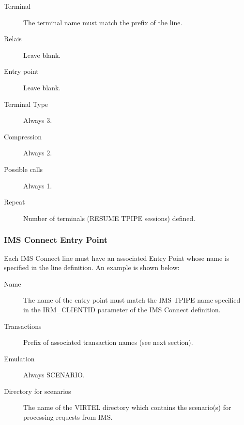\documentclass[letterpaper,10pt,english]{sphinxmanual}
\begin{document}

\begin{description}
\item[{Terminal}] \leavevmode
The terminal name must match the prefix of the line.

\item[{Relais}] \leavevmode
Leave blank.

\item[{Entry point}] \leavevmode
Leave blank.

\item[{Terminal Type}] \leavevmode
Always 3.

\item[{Compression}] \leavevmode
Always 2.

\item[{Possible calls}] \leavevmode
Always 1.

\item[{Repeat}] \leavevmode
Number of terminals (RESUME TPIPE sessions) defined.

\end{description}


\subsubsection{IMS Connect Entry Point}
\label{\detokenize{connectivity_guide:ims-connect-entry-point}}
Each IMS Connect line must have an associated Entry Point whose name is specified in the line definition. An example is shown below:


\begin{description}
\item[{Name}] \leavevmode
The name of the entry point must match the IMS TPIPE name specified
in the IRM\_CLIENTID parameter of the IMS Connect definition.

\item[{Transactions}] \leavevmode
Prefix of associated transaction names (see next section).

\item[{Emulation}] \leavevmode
Always SCENARIO.

\item[{Directory for scenarios}] \leavevmode
The name of the VIRTEL directory which contains the scenario(s) for
processing requests from IMS.

\end{description}
\end{document}
